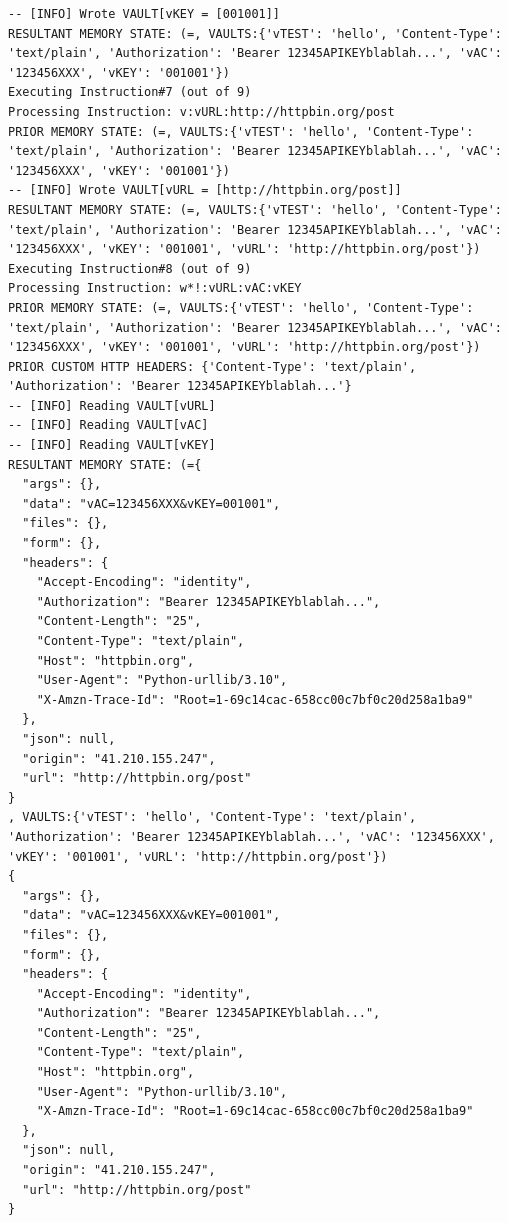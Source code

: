 \documentclass[a4paper, 18pt]{book} %
\begin{document}
{{{\begin{tcolorbox}[myterminalstyle, title=DEBUGGING a TEA custom HTTP HEADERS with HTTP POST scenario, breakable]
\begin{lstlisting}[breaklines=true]
-- [INFO] Wrote VAULT[vKEY = [001001]]
RESULTANT MEMORY STATE: (=, VAULTS:{'vTEST': 'hello', 'Content-Type': 'text/plain', 'Authorization': 'Bearer 12345APIKEYblablah...', 'vAC': '123456XXX', 'vKEY': '001001'})
Executing Instruction#7 (out of 9)
Processing Instruction: v:vURL:http://httpbin.org/post
PRIOR MEMORY STATE: (=, VAULTS:{'vTEST': 'hello', 'Content-Type': 'text/plain', 'Authorization': 'Bearer 12345APIKEYblablah...', 'vAC': '123456XXX', 'vKEY': '001001'})
-- [INFO] Wrote VAULT[vURL = [http://httpbin.org/post]]
RESULTANT MEMORY STATE: (=, VAULTS:{'vTEST': 'hello', 'Content-Type': 'text/plain', 'Authorization': 'Bearer 12345APIKEYblablah...', 'vAC': '123456XXX', 'vKEY': '001001', 'vURL': 'http://httpbin.org/post'})
Executing Instruction#8 (out of 9)
Processing Instruction: w*!:vURL:vAC:vKEY
PRIOR MEMORY STATE: (=, VAULTS:{'vTEST': 'hello', 'Content-Type': 'text/plain', 'Authorization': 'Bearer 12345APIKEYblablah...', 'vAC': '123456XXX', 'vKEY': '001001', 'vURL': 'http://httpbin.org/post'})
PRIOR CUSTOM HTTP HEADERS: {'Content-Type': 'text/plain', 'Authorization': 'Bearer 12345APIKEYblablah...'}
-- [INFO] Reading VAULT[vURL]
-- [INFO] Reading VAULT[vAC]
-- [INFO] Reading VAULT[vKEY]
RESULTANT MEMORY STATE: (={
  "args": {}, 
  "data": "vAC=123456XXX&vKEY=001001", 
  "files": {}, 
  "form": {}, 
  "headers": {
    "Accept-Encoding": "identity", 
    "Authorization": "Bearer 12345APIKEYblablah...", 
    "Content-Length": "25", 
    "Content-Type": "text/plain", 
    "Host": "httpbin.org", 
    "User-Agent": "Python-urllib/3.10", 
    "X-Amzn-Trace-Id": "Root=1-69c14cac-658cc00c7bf0c20d258a1ba9"
  }, 
  "json": null, 
  "origin": "41.210.155.247", 
  "url": "http://httpbin.org/post"
}
, VAULTS:{'vTEST': 'hello', 'Content-Type': 'text/plain', 'Authorization': 'Bearer 12345APIKEYblablah...', 'vAC': '123456XXX', 'vKEY': '001001', 'vURL': 'http://httpbin.org/post'})
{
  "args": {}, 
  "data": "vAC=123456XXX&vKEY=001001", 
  "files": {}, 
  "form": {}, 
  "headers": {
    "Accept-Encoding": "identity", 
    "Authorization": "Bearer 12345APIKEYblablah...", 
    "Content-Length": "25", 
    "Content-Type": "text/plain", 
    "Host": "httpbin.org", 
    "User-Agent": "Python-urllib/3.10", 
    "X-Amzn-Trace-Id": "Root=1-69c14cac-658cc00c7bf0c20d258a1ba9"
  }, 
  "json": null, 
  "origin": "41.210.155.247", 
  "url": "http://httpbin.org/post"
}
  \end{lstlisting}
  \end{tcolorbox}
\vspace{2em}



}}}
\end{document}
